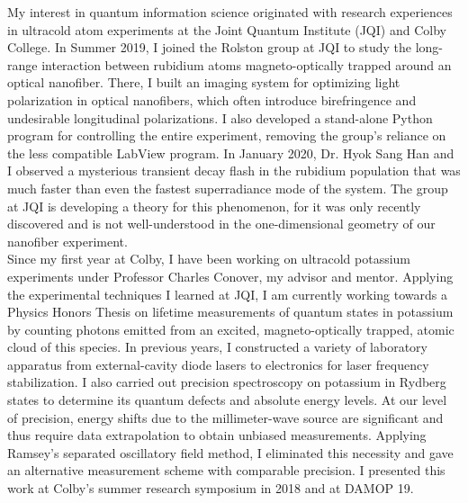 \documentclass[12pt]{article}
\begin{document}
My interest in quantum information science originated with research experiences in ultracold atom experiments at the Joint Quantum Institute (JQI) and Colby College. In Summer 2019, I joined the Rolston group at JQI to study the long-range interaction between rubidium atoms magneto-optically trapped around an optical nanofiber. There, I built an imaging system for optimizing light polarization in optical nanofibers, which often introduce birefringence and undesirable longitudinal polarizations. I also developed a stand-alone Python program for controlling the entire experiment, removing the group's reliance on the less compatible LabView program. In January 2020, Dr. Hyok Sang Han and I observed a mysterious transient decay flash in the rubidium population that was much faster than even the fastest superradiance mode of the system.  The group at JQI is developing a theory for this phenomenon, for it was only recently discovered and is not well-understood in the one-dimensional geometry of our nanofiber experiment.   \\ 

Since my first year at Colby, I have been working on ultracold potassium experiments under Professor Charles Conover, my advisor and mentor. Applying the experimental techniques I learned at JQI, I am currently working towards a Physics Honors Thesis on lifetime measurements of quantum states in potassium by counting photons emitted from an excited, magneto-optically trapped, atomic cloud of this species. In previous years, I constructed a variety of laboratory apparatus from external-cavity diode lasers to electronics for laser frequency stabilization. I also carried out precision spectroscopy on potassium in Rydberg states to determine its quantum defects and absolute energy levels. At our level of precision, energy shifts due to the millimeter-wave source are significant and thus require data extrapolation to obtain unbiased measurements. Applying Ramsey's separated oscillatory field method, I eliminated this necessity and gave an alternative measurement scheme with comparable precision. I presented this work at Colby's summer research symposium in 2018 and at DAMOP 19.  \\
\end{document}
